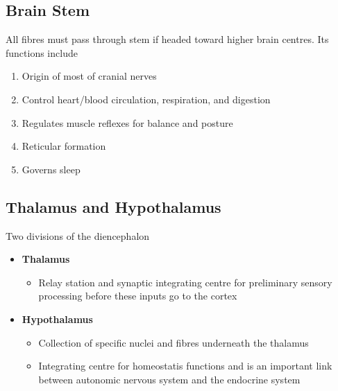 \documentclass[11pt]{article}
\begin{document}
\subsection{Brain Stem}
All fibres must pass through stem if headed toward higher brain centres. Its functions include
\begin{enumerate}
\item Origin of most of cranial nerves
\item Control heart/blood circulation, respiration, and digestion
\item Regulates muscle reflexes for balance and posture
\item Reticular formation
\item Governs sleep

\end{enumerate}
\subsection{Thalamus and Hypothalamus}
Two divisions of the diencephalon
\begin{itemize}
\item \textbf{Thalamus}
\begin{itemize}
\item Relay station and synaptic integrating centre for preliminary sensory processing before these inputs go to the cortex
\end{itemize}
\item \textbf{Hypothalamus}
\begin{itemize}
\item Collection of specific nuclei and fibres underneath the thalamus 
\item Integrating centre for homeostatis functions and is an important link between autonomic nervous system and the endocrine system
\end{itemize}
\end{itemize}
\end{document}
